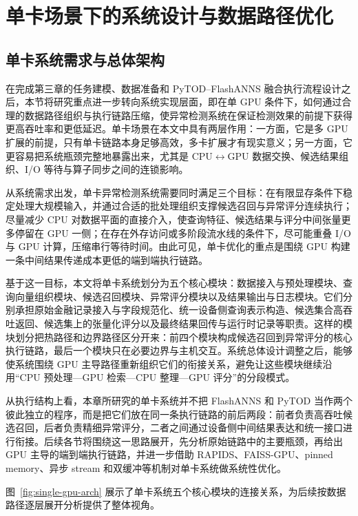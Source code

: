 
\chapter{单卡场景下的系统设计与数据路径优化}

\section{单卡系统需求与总体架构}

在完成第三章的任务建模、数据准备和 PyTOD--FlashANNS 融合执行流程设计之后，本节将研究重点进一步转向系统实现层面，即在单 GPU 条件下，如何通过合理的数据路径组织与执行链路压缩，使异常检测系统在保证检测效果的前提下获得更高吞吐率和更低延迟。单卡场景在本文中具有两层作用：一方面，它是多 GPU 扩展的前提，只有单卡链路本身足够高效，多卡扩展才有现实意义；另一方面，它更容易把系统瓶颈完整地暴露出来，尤其是 CPU$\leftrightarrow$GPU 数据交换、候选结果组织、I/O 等待与算子同步之间的连锁影响。

从系统需求出发，单卡异常检测系统需要同时满足三个目标：在有限显存条件下稳定处理大规模输入，并通过合适的批处理组织支撑候选召回与异常评分连续执行；尽量减少 CPU 对数据平面的直接介入，使查询特征、候选结果与评分中间张量更多停留在 GPU 一侧；在存在外存访问或多阶段流水线的条件下，尽可能重叠 I/O 与 GPU 计算，压缩串行等待时间。由此可见，单卡优化的重点是围绕 GPU 构建一条中间结果传递成本更低的端到端执行链路。

基于这一目标，本文将单卡系统划分为五个核心模块：数据接入与预处理模块、查询向量组织模块、候选召回模块、异常评分模块以及结果输出与日志模块。它们分别承担原始金融记录接入与字段规范化、统一设备侧查询表示构造、候选集合高吞吐返回、候选集上的张量化评分以及最终结果回传与运行时记录等职责。这样的模块划分把热路径和边界路径区分开来：前四个模块构成候选召回到异常评分的核心执行链路，最后一个模块只在必要边界与主机交互。系统总体设计调整之后，能够使系统围绕 GPU 主导路径重新组织它们的衔接关系，避免让这些模块继续沿用``CPU 预处理---GPU 检索---CPU 整理---GPU 评分''的分段模式。

从执行结构上看，本章所研究的单卡系统并不把 FlashANNS 和 PyTOD 当作两个彼此独立的程序，而是把它们放在同一条执行链路的前后两段：前者负责高吞吐候选召回，后者负责精细异常评分，二者之间通过设备侧中间结果表达和统一接口进行衔接。后续各节将围绕这一思路展开，先分析原始链路中的主要瓶颈，再给出 GPU 主导的端到端执行链路，并进一步借助 RAPIDS、FAISS-GPU、pinned memory、异步 stream 和双缓冲等机制对单卡系统做系统性优化。

图~\ref{fig:single-gpu-arch} 展示了单卡系统五个核心模块的连接关系，为后续按数据路径逐层展开分析提供了整体视角。

